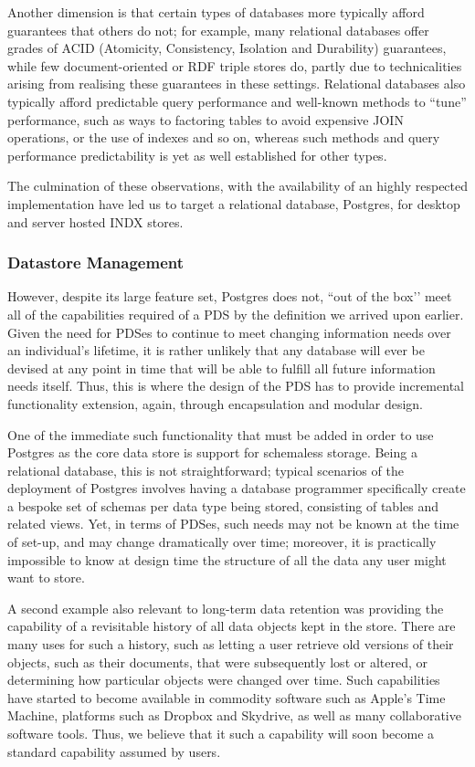 \documentclass[runningheads,a4paper]{llncs}
\begin{document}
Another dimension is that certain types of databases more typically afford guarantees that others do not; for example, many relational databases offer grades of ACID (Atomicity, Consistency, Isolation and Durability) guarantees, while few document-oriented or RDF triple stores do, partly due to technicalities arising from realising these guarantees in these settings.  Relational databases also typically afford predictable query performance and well-known methods to “tune” performance, such as ways to factoring tables to avoid expensive JOIN operations, or the use of indexes and so on, whereas such methods and query performance predictability is yet as well established for other types.

The culmination of these observations, with the availability of an highly respected implementation have led us to target a relational database, Postgres, for desktop and server hosted INDX stores.  



\subsubsection{Datastore Management}
However, despite its large feature set, Postgres does not, ``out of the box’’ meet all of the capabilities required of a PDS by the definition we arrived upon earlier.  Given the need for PDSes to continue to meet changing information needs over an individual’s lifetime, it is rather unlikely that any database will ever be devised at any point in time that will be able to fulfill all future information needs itself.  Thus, this is where the design of the PDS has to provide incremental functionality extension, again, through encapsulation and modular design.

One of the immediate such functionality that must be added in order to use Postgres as the core data store is support for schemaless storage.  Being a relational database, this is not straightforward; typical scenarios of the deployment of Postgres involves having a database programmer specifically create a bespoke set of schemas per data type being stored, consisting of tables and related views. Yet, in terms of PDSes, such needs may not be known at the time of set-up, and may change dramatically over time; moreover, it is practically impossible to know at design time the structure of all the data any user might want to store.

A second example also relevant to long-term data retention was providing the capability of a revisitable history of all data objects kept in the store.  There are many uses for such a history, such as letting a user retrieve old versions of their objects, such as their documents, that were subsequently lost or altered, or determining how particular objects were changed over time.  Such capabilities have started to become available in commodity software such as Apple’s Time Machine, platforms such as Dropbox and Skydrive, as well as many collaborative software tools.  Thus, we believe that it such a capability will soon become a standard capability assumed by users.
\end{document}

